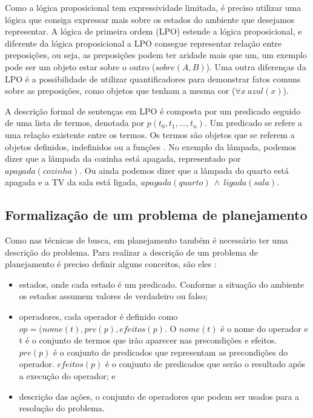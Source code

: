 Como a lógica proposicional tem expressividade limitada, é preciso utilizar uma lógica que consiga expressar mais sobre os estados do ambiente que desejamos representar. 
A lógica de primeira ordem (LPO) estende a lógica proposicional, e diferente da lógica proposicional a LPO consegue representar relação entre preposições, ou seja, as preposições podem ter aridade mais que um, um exemplo pode ser um objeto estar sobre o outro ($sobre(A,B)$). Uma outra diferenças da LPO é a possibilidade de utilizar quantificadores para demonstrar fatos comuns sobre as preposições, como objetos que tenham a mesma cor ($\forall x~ azul(x)$).

A descrição formal de sentenças em LPO é composta por um predicado seguido de uma lista de termos, denotada por $p(t_{0}, t_{1}, ..., t_{n})$. 
Um predicado se refere a uma relação existente entre os termos. 
Os termos são objetos que se referem a objetos definidos, indefinidos ou a funções \cite{intelligence2003modern}. 
No exemplo da lâmpada, podemos dizer que a lâmpada da cozinha está apagada, representado por $apagada(cozinha)$. 
Ou ainda podemos dizer que a lâmpada do quarto está apagada e a TV da sala está ligada, $apagada(quarto)~ \wedge~ ligada(sala)$.  

\subsection{Formalização de um problema de planejamento}

Como nas técnicas de busca, em planejamento também é necessário ter uma descrição do problema.
Para realizar a descrição de um problema de planejamento é preciso definir alguns conceitos, são eles \cite{intelligence2003modern, ghallab2004automated, meneguzzi2015planning}:
\begin{itemize}
	\item estados, onde cada estado é um predicado. Conforme a situação do ambiente os estados assumem valores de verdadeiro ou falso;
	\item operadores, cada operador é definido como $op = (nome(t), pre(p), efeitos(p)$. 
	O $nome(t)$ é o nome do operador e t é o conjunto de termos que irão aparecer nas precondições e efeitos. $pre(p)$ é o conjunto de predicados que representam as precondições do operador. $efeitos(p)$ é o conjunto de predicados que serão o resultado após a execução do operador; e
	\item descrição das ações, o conjunto de operadores que podem ser usados para a resolução do problema.
\end{itemize}

